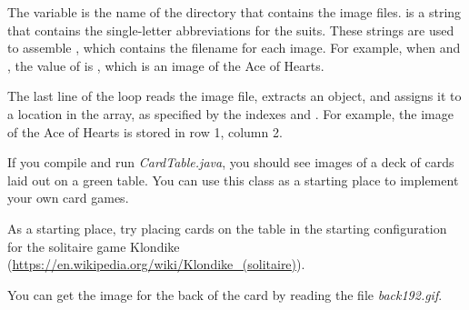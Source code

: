 \begin{exercise}
The variable  is the name of the directory that contains the image files.
 is a string that contains the single-letter abbreviations for the suits.
These strings are used to assemble , which contains the filename for each image.
For example, when  and , the value of  is , which is an image of the Ace of Hearts.

The last line of the loop reads the image file, extracts an  object, and assigns it to a location in the array, as specified by the indexes  and .
For example, the image of the Ace of Hearts is stored in row 1, column 2.

If you compile and run {\it CardTable.java}, you should see images of a deck of cards laid out on a green table.
You can use this class as a starting place to implement your own card games.



As a starting place, try placing cards on the table in the starting configuration for the solitaire game Klondike (\url{https://en.wikipedia.org/wiki/Klondike_(solitaire)}).

You can get the image for the back of the card by reading the file {\it back192.gif}.

\end{exercise}
